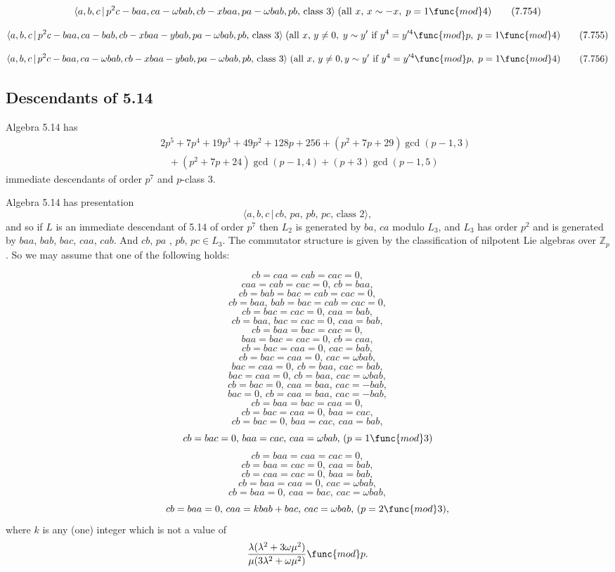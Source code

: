 \documentclass[10pt]{article}
\begin{document}
\begin{equation}
\langle a,b,c\,|\,p^{2}c-baa,ca-\omega bab,cb-xbaa,pa-\omega bab,pb,\,\text{%
class }3\rangle \;(\text{all }x,\,x\sim -x,\;p=1\func{mod}4)  \tag{7.754}
\end{equation}

\begin{equation}
\langle a,b,c\,|\,p^{2}c-baa,ca-bab,cb-xbaa-ybab,pa-\omega bab,pb,\,\text{%
class }3\rangle \;(\text{all }x,\,y\neq 0,\;y\sim y^{\prime }\text{ if }%
y^{4}=y^{\prime 4}\func{mod}p,\;p=1\func{mod}4)  \tag{7.755}
\end{equation}

\begin{equation}
\langle a,b,c\,|\,p^{2}c-baa,ca-\omega bab,cb-xbaa-ybab,pa-\omega bab,pb,\,%
\text{class }3\rangle \;(\text{all }x,\,y\neq 0,y\sim y^{\prime}\text{ if }%
y^4=y^{\prime 4}\func{mod}p,\;p=1\func{mod}4)  \tag{7.756}
\end{equation}

\subsection{Descendants of 5.14}

Algebra 5.14 has 
\begin{eqnarray*}
&&2p^{5}+7p^{4}+19p^{3}+49p^{2}+128p+256+(p^{2}+7p+29)\gcd (p-1,3) \\
&&\;\;\;+(p^{2}+7p+24)\gcd (p-1,4)+(p+3)\gcd (p-1,5)
\end{eqnarray*}%
immediate descendants of order $p^{7}$ and $p$-class $3$.

Algebra 5.14 has presentation 
\[
\langle a,b,c\,|\,cb,\,pa,\,pb,\,pc,\,\text{class }2\rangle , 
\]%
and so if $L$ is an immediate descendant of 5.14 of order $p^{7}$ then $%
L_{2} $ is generated by $ba$, $ca$ modulo $L_{3}$, and $L_{3}$ has order $%
p^{2}$ and is generated by $baa$, $bab$, $bac$, $caa$, $cab$. And $cb$, $pa$%
, $pb$, $pc\in L_{3}$. The commutator structure is given by the
classification of nilpotent Lie algebras over $\mathbb{Z}_{p}$. So we may
assume that one of the following holds:

\[
cb=caa=cab=cac=0, 
\]%
\[
caa=cab=cac=0,\,cb=baa, 
\]%
\[
cb=bab=bac=cab=cac=0, 
\]%
\[
cb=baa,\,bab=bac=cab=cac=0, 
\]%
\[
cb=bac=cac=0,\,caa=bab, 
\]%
\[
cb=baa,\,bac=cac=0,\,caa=bab, 
\]%
\[
cb=baa=bac=cac=0, 
\]%
\[
baa=bac=cac=0,\,cb=caa, 
\]%
\[
cb=bac=caa=0,\,cac=bab, 
\]%
\[
cb=bac=caa=0,\,cac=\omega bab, 
\]%
\[
bac=caa=0,\,cb=baa,\,cac=bab, 
\]%
\[
bac=caa=0,\,cb=baa,\,cac=\omega bab, 
\]%
\[
cb=bac=0,\,caa=baa,\,cac=-bab, 
\]%
\[
bac=0,\,cb=caa=baa,\,cac=-bab, 
\]%
\[
cb=baa=bac=caa=0, 
\]%
\[
cb=bac=caa=0,\,baa=cac, 
\]%
\[
cb=bac=0,\,baa=cac,\,caa=bab, 
\]%
\[
cb=bac=0,\,baa=cac,\,caa=\omega bab,\,(p=1\func{mod}3) 
\]%
\[
cb=baa=caa=cac=0, 
\]%
\[
cb=baa=cac=0,\,caa=bab, 
\]%
\[
cb=caa=cac=0,\,baa=bab, 
\]%
\[
cb=baa=caa=0,\,cac=\omega bab, 
\]%
\[
cb=baa=0,\,caa=bac,\,cac=\omega bab, 
\]%
\[
cb=baa=0,\,caa=kbab+bac,\,cac=\omega bab,\,(p=2\func{mod}3), 
\]%
where $k$ is any (one) integer which is not a value of 
\[
\frac{\lambda (\lambda ^{2}+3\omega \mu ^{2})}{\mu (3\lambda ^{2}+\omega \mu
^{2})}\func{mod}p. 
\]
\end{document}
